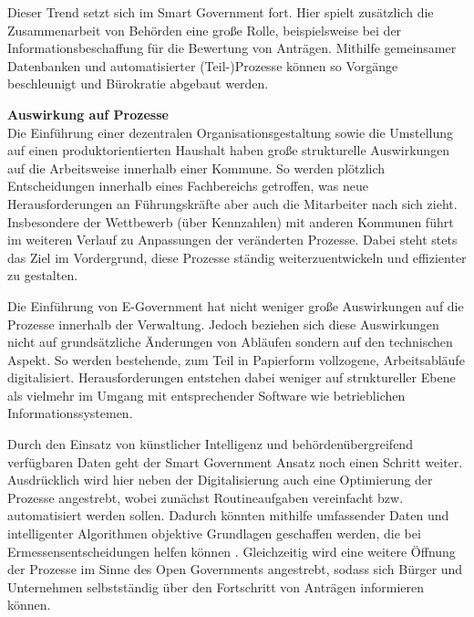 Dieser Trend setzt sich im Smart Government fort.
Hier spielt zusätzlich die Zusammenarbeit von Behörden eine große Rolle, beispielsweise bei der Informationsbeschaffung für die Bewertung von Anträgen.
Mithilfe gemeinsamer Datenbanken und automatisierter (Teil-)Prozesse können so Vorgänge beschleunigt und Bürokratie abgebaut werden.

\textbf{Auswirkung auf Prozesse}\\
Die Einführung einer dezentralen Organisationsgestaltung sowie die Umstellung auf einen produktorientierten Haushalt haben große strukturelle Auswirkungen auf die Arbeitsweise innerhalb einer Kommune.
So werden plötzlich Entscheidungen innerhalb eines Fachbereichs getroffen, was neue Herausforderungen an Führungskräfte aber auch die Mitarbeiter nach sich zieht.
Insbesondere der Wettbewerb (über Kennzahlen) mit anderen Kommunen führt im weiteren Verlauf zu Anpassungen der veränderten Prozesse.
Dabei steht stets das Ziel im Vordergrund, diese Prozesse ständig weiterzuentwickeln und effizienter zu gestalten.

Die Einführung von E-Government hat nicht weniger große Auswirkungen auf die Prozesse innerhalb der Verwaltung.
Jedoch beziehen sich diese Auswirkungen nicht auf grundsätzliche Änderungen von Abläufen sondern auf den technischen Aspekt.
So werden bestehende, zum Teil in Papierform vollzogene, Arbeitsabläufe digitalisiert.
Herausforderungen entstehen dabei weniger auf struktureller Ebene als vielmehr im Umgang mit entsprechender Software wie betrieblichen Informationssystemen.

Durch den Einsatz von künstlicher Intelligenz und behördenübergreifend verfügbaren Daten geht der Smart Government Ansatz noch einen Schritt weiter.
Ausdrücklich wird hier neben der Digitalisierung auch eine Optimierung der Prozesse angestrebt, wobei zunächst Routineaufgaben vereinfacht bzw. automatisiert werden sollen.
Dadurch könnten mithilfe umfassender Daten und intelligenter Algorithmen objektive Grundlagen geschaffen werden, die bei Ermessensentscheidungen helfen können \citep[][]{Demaj2018}.
Gleichzeitig wird eine weitere Öffnung der Prozesse im Sinne des Open Governments angestrebt, sodass sich Bürger und Unternehmen selbstständig über den Fortschritt von Anträgen informieren können.



